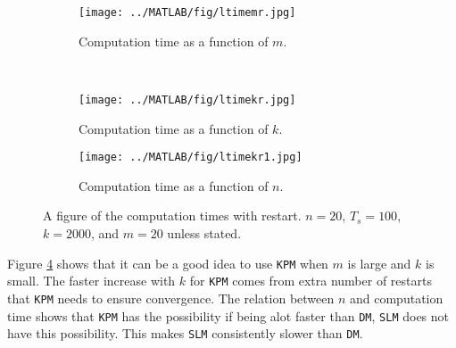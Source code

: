 \begin{figure}[H]
        \centering
        \begin{subfigure}[b]{0.45\textwidth}
                \texttt{[image: ../MATLAB/fig/ltimemr.jpg]}
                \caption{ Computation time as a function of $m$. }
                \label{fig:ltimemr}
        \end{subfigure}
        ~
        \begin{subfigure}[b]{0.45\textwidth}
                \texttt{[image: ../MATLAB/fig/ltimekr.jpg]}
                \caption{ Computation time as a function of $k$. }
                \label{fig:ltimekr}
        \end{subfigure}
        
        \begin{subfigure}[b]{0.45\textwidth}
                \texttt{[image: ../MATLAB/fig/ltimekr1.jpg]}
                \caption{ Computation time as a function of $n$. }
                \label{fig:ltimekr1}
        \end{subfigure}
        \caption{ A figure of the computation times with restart. $n = 20$, $T_s = 100$, $k = 2000$, and $m = 20$ unless stated. }
        \label{fig:ltime1}
\end{figure}
Figure \ref{fig:ltime1} shows that it can be a good idea to use \texttt{KPM} when $m$ is large and $k$ is small. The faster increase with $k$ for \texttt{KPM} comes from extra number of restarts that \texttt{KPM} needs to ensure convergence. The relation between $n$ and computation time shows that \texttt{KPM} has the possibility if being alot \cite{alot} faster than \texttt{DM}, \texttt{SLM} does not have this possibility. This makes \texttt{SLM} consistently slower than \texttt{DM}. \\
